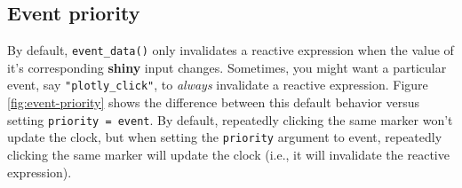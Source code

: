 \documentclass[
  12pt,
]{krantz}
\newenvironment{Shaded}{\begin{snugshade}}{\end{snugshade}}
\newcommand{\ControlFlowTok}[1]{\textcolor[rgb]{0.13,0.29,0.53}{\textbf{#1}}}
\newcommand{\DataTypeTok}[1]{\textcolor[rgb]{0.13,0.29,0.53}{#1}}
\newcommand{\DecValTok}[1]{\textcolor[rgb]{0.00,0.00,0.81}{#1}}
\newcommand{\KeywordTok}[1]{\textcolor[rgb]{0.13,0.29,0.53}{\textbf{#1}}}
\newcommand{\NormalTok}[1]{#1}
\newcommand{\OperatorTok}[1]{\textcolor[rgb]{0.81,0.36,0.00}{\textbf{#1}}}
\newcommand{\StringTok}[1]{\textcolor[rgb]{0.31,0.60,0.02}{#1}}
\begin{document}
\hypertarget{event-priority}{%
\subsection{Event priority}\label{event-priority}}


By default, \texttt{event\_data()} only invalidates a reactive expression when the value of it's corresponding \textbf{shiny} input changes. Sometimes, you might want a particular event, say \texttt{"plotly\_click"}, to \emph{always} invalidate a reactive expression. Figure \ref{fig:event-priority} shows the difference between this default behavior versus setting \texttt{priority\ =\ \textquotesingle{}event\textquotesingle{}}. By default, repeatedly clicking the same marker won't update the clock, but when setting the \texttt{priority} argument to event, repeatedly clicking the same marker will update the clock (i.e., it will invalidate the reactive expression).

\begin{Shaded}
\end{Shaded}
\end{document}
